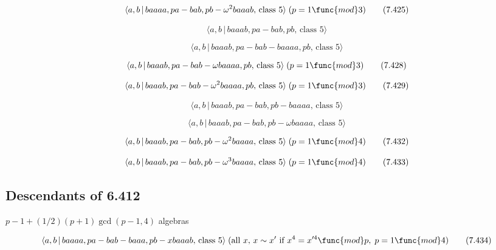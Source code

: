 \documentclass[10pt]{article}
\begin{document}
\begin{equation}
\langle a,b\,|\,baaaa,pa-bab,pb-\omega ^{2}baaab,\,\text{class }5\rangle
\;(p=1\func{mod}3)  \tag{7.425}
\end{equation}

\begin{equation}
\langle a,b\,|\,baaab,pa-bab,pb,\,\text{class }5\rangle  \tag{7.426}
\end{equation}

\begin{equation}
\langle a,b\,|\,baaab,pa-bab-baaaa,pb,\,\text{class }5\rangle  \tag{7.427}
\end{equation}

\begin{equation}
\langle a,b\,|\,baaab,pa-bab-\omega baaaa,pb,\,\text{class }5\rangle \;(p=1%
\func{mod}3)  \tag{7.428}
\end{equation}

\begin{equation}
\langle a,b\,|\,baaab,pa-bab-\omega ^{2}baaaa,pb,\,\text{class }5\rangle
\;(p=1\func{mod}3)  \tag{7.429}
\end{equation}

\begin{equation}
\langle a,b\,|\,baaab,pa-bab,pb-baaaa,\,\text{class }5\rangle  \tag{7.430}
\end{equation}

\begin{equation}
\langle a,b\,|\,baaab,pa-bab,pb-\omega baaaa,\,\text{class }5\rangle 
\tag{7.431}
\end{equation}

\begin{equation}
\langle a,b\,|\,baaab,pa-bab,pb-\omega ^{2}baaaa,\,\text{class }5\rangle
\;(p=1\func{mod}4)  \tag{7.432}
\end{equation}

\begin{equation}
\langle a,b\,|\,baaab,pa-bab,pb-\omega ^{3}baaaa,\,\text{class }5\rangle
\;(p=1\func{mod}4)  \tag{7.433}
\end{equation}

\subsection{Descendants of 6.412}

$p-1+(1/2)(p+1)\gcd (p-1,4)$ algebras

\begin{equation}
\langle a,b\,|\,baaaa,pa-bab-baaa,pb-xbaaab,\,\text{class }5\rangle \;(\text{%
all }x,\,x\sim x^{\prime }\ \text{if}\ x^{4}=x^{\prime 4}\func{mod}p,\;p=1%
\func{mod}4)  \tag{7.434}
\end{equation}
\end{document}
